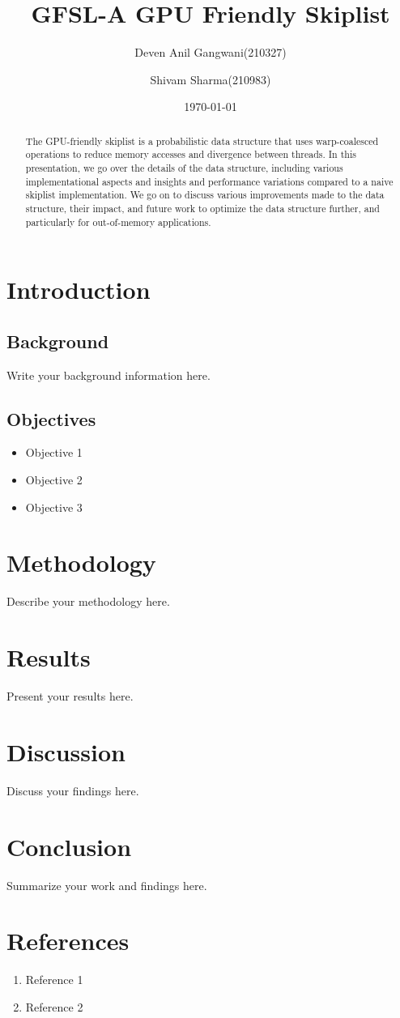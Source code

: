 \documentclass[12pt,a4paper]{article}
\title{\color{titlecolor}\Huge GFSL-A GPU Friendly Skiplist}
\author{Deven Anil Gangwani(210327) \and Shivam Sharma(210983)}
\date{\today}
\begin{document}
\maketitle
\thispagestyle{empty}
\newpage

\begin{abstract}
    \noindent
    The GPU-friendly skiplist is a probabilistic data structure that uses warp-coalesced operations to reduce memory accesses and divergence between threads. In this presentation, we go over the details of the data structure, including various implementational aspects and insights and performance variations compared to a naive skiplist implementation. We go on to discuss various improvements made to the data structure, their impact, and future work to optimize the data structure further, and particularly for out-of-memory applications.
\end{abstract}

\tableofcontents
\newpage

\section{Introduction}
\subsection{Background}
Write your background information here.

\subsection{Objectives}
\begin{itemize}
    \item Objective 1
    \item Objective 2
    \item Objective 3
\end{itemize}

\section{Methodology}
Describe your methodology here.

\section{Results}
Present your results here.

\section{Discussion}
Discuss your findings here.

\section{Conclusion}
Summarize your work and findings here.

\section*{References}
\begin{enumerate}
    \item Reference 1
    \item Reference 2
\end{enumerate}
\end{document}
